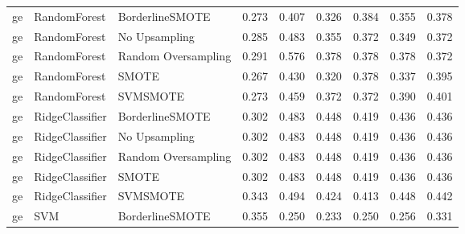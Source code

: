 \begin{tabular}{lllllllll}
      ge &                 RandomForest &     BorderlineSMOTE & 0.273 &                     0.407 &                 0.326 &                  0.384 &                                   0.355 &     0.378 \\
      ge &                 RandomForest &       No Upsampling & 0.285 &                     0.483 &                 0.355 &                  0.372 &                                   0.349 &     0.372 \\
      ge &                 RandomForest & Random Oversampling & 0.291 &                     0.576 &                 0.378 &                  0.378 &                                   0.378 &     0.372 \\
      ge &                 RandomForest &               SMOTE & 0.267 &                     0.430 &                 0.320 &                  0.378 &                                   0.337 &     0.395 \\
      ge &                 RandomForest &            SVMSMOTE & 0.273 &                     0.459 &                 0.372 &                  0.372 &                                   0.390 &     0.401 \\
      ge &              RidgeClassifier &     BorderlineSMOTE & 0.302 &                     0.483 &                 0.448 &                  0.419 &                                   0.436 &     0.436 \\
      ge &              RidgeClassifier &       No Upsampling & 0.302 &                     0.483 &                 0.448 &                  0.419 &                                   0.436 &     0.436 \\
      ge &              RidgeClassifier & Random Oversampling & 0.302 &                     0.483 &                 0.448 &                  0.419 &                                   0.436 &     0.436 \\
      ge &              RidgeClassifier &               SMOTE & 0.302 &                     0.483 &                 0.448 &                  0.419 &                                   0.436 &     0.436 \\
      ge &              RidgeClassifier &            SVMSMOTE & 0.343 &                     0.494 &                 0.424 &                  0.413 &                                   0.448 &     0.442 \\
      ge &                          SVM &     BorderlineSMOTE & 0.355 &                     0.250 &                 0.233 &                  0.250 &                                   0.256 &     0.331 \\

\end{tabular}
